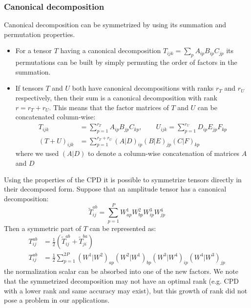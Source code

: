 \subsubsection{Canonical decomposition}
Canonical decomposition can be symmetrized by using its summation and 
permutation properties.
\begin{itemize}
  \item For a tensor $T$ having a canonical decomposition $T_{ijk} = \sum_{p} 
A_{ip} B_{ip} C_{jp}$ its permutations can be built by simply permuting the 
order of factors in the summation.
  \item If tensors $T$ and $U$ both have canonical decompositions with ranks 
$r_{T}$ and $r_{U}$ respectively, then their sum is a canonical decomposition 
with rank $r = r_{T} + r_{U}$. This means that the factor matrices of $T$ and 
$U$ can be concatenated column-wise:
%
\begin{equation}
\begin{aligned}
 T_{ijk} &= \sum_{p=1}^{r_{T}} A_{ip} B_{jp} C_{kp}, \qquad U_{ijk} = 
\sum_{p=1}^{r_{U}} D_{ip} E_{jp} F_{kp} \\
(T + U)_{ijk} &= \sum_{p=1}^{r_{T} + r_{U}} (A | D)_{ip} (B | E)_{jp} (C | 
F)_{kp}
\end{aligned}
\end{equation}
where we used $(A | D)$ to denote a column-wise concatenation of matrices $A$ 
and $D$
\end{itemize}
 
Using the properties of the CPD it is possible to symmetrize tensors directly 
in their decomposed form. Suppose that an amplitude tensor has a 
canonical decomposition:
%
\begin{equation}
 \tilde{T}_{ij}^{ab} = \sum_{p=1}^{P} W^{1}_{ap} W^{2}_{bp} 
W^{3}_{ip} W^{4}_{jp}
\end{equation}
%
Then a symmetric part of $T$ can be 
represented as:
%
\begin{equation}
\begin{aligned}
 T_{ij}^{ab} &= \frac{1}{2} (\tilde{T}_{ij}^{ab} + \tilde{T}_{ji}^{ba}) \\
 T_{ij}^{ab} &= \frac{1}{2} \sum_{p=1}^{2P} (W^{1} | W^{2})_{ap} (W^{2} | 
W^{1})_{bp} (W^{3} | W^{4})_{ip} (W^{4} | W^{3})_{jp} 
\end{aligned}
\end{equation}
%
the normalization scalar can be absorbed into one of the new factors. We note 
that the symmetrized decomposition may not have an optimal rank (e.g. 
CPD with a lower rank and same accuracy may exist), but this growth of rank did 
not pose a problem in our applications.

